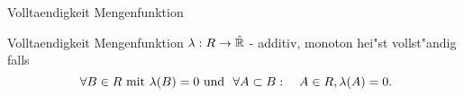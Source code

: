 \documentclass[class=article, crop=false]{standalone}
\begin{document}
\begin{zettel}{Volltaendigkeit Mengenfunktion}
\begin{flashcard}[2kj1nkmh]{Volltaendigkeit Mengenfunktion}
	$\lambda : R \to  \hat{\mathbb{R}}$ - additiv, monoton hei"st vollst"andig falls
	\[
		\forall B \in R \tx{mit} \lambda(B)= 0 \tx{und}  \forall A \subset  B : \quad A \in R, \lambda(A) = 0
	.\]
\end{flashcard}
\end{zettel}
\end{document}
